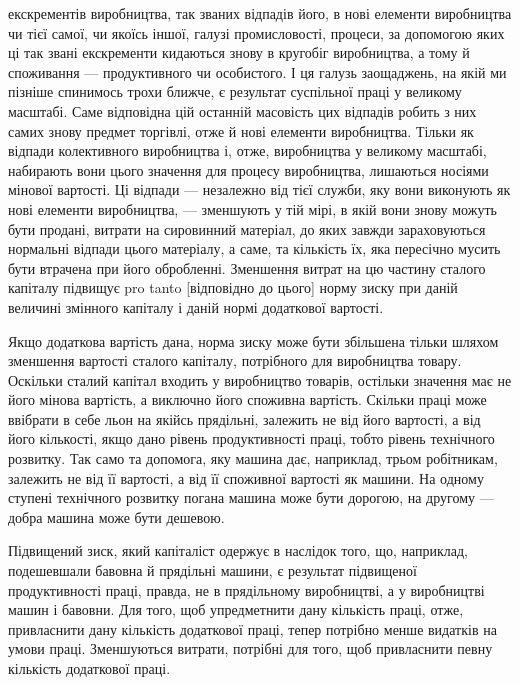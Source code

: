 \parcont{}  %
екскрементів виробництва, так званих відпадів його, в нові елементи
виробництва чи тієї самої, чи якоїсь іншої, галузі промисловості,
процеси, за допомогою яких ці так звані екскременти
кидаються знову в кругобіг виробництва, а тому й споживання —
продуктивного чи особистого. І ця галузь заощаджень, на якій
ми пізніше спинимось трохи ближче, є результат суспільної
праці у великому масштабі. Саме відповідна цій останній масовість
цих відпадів робить з них самих знову предмет торгівлі,
отже й нові елементи виробництва. Тільки як відпади колективного
виробництва і, отже, виробництва у великому масштабі, набирають
вони цього значення для процесу виробництва, лишаються
носіями мінової вартості. Ці відпади — незалежно від тієї служби,
яку вони виконують як нові елементи виробництва, — зменшують
у тій мірі, в якій вони знову можуть бути продані, витрати на
сировинний матеріал, до яких завжди зараховуються нормальні
відпади цього матеріалу, а саме, та кількість їх, яка пересічно
мусить бути втрачена при його обробленні. Зменшення витрат
на цю частину сталого капіталу підвищує pro tanto [відповідно
до цього] норму зиску при даній величині змінного капіталу
і даній нормі додаткової вартості.

Якщо додаткова вартість дана, норма зиску може бути
збільшена тільки шляхом зменшення вартості сталого капіталу,
потрібного для виробництва товару. Оскільки сталий капітал
входить у виробництво товарів, остільки значення має не його
мінова вартість, а виключно його споживна вартість. Скільки
праці може ввібрати в себе льон на якійсь прядільні, залежить
не від його вартості, а від його кількості, якщо дано рівень
продуктивності праці, тобто рівень технічного розвитку. Так
само та допомога, яку машина дає, наприклад, трьом робітникам,
залежить не від її вартості, а від її споживної вартості як машини.
На одному ступені технічного розвитку погана машина може бути
дорогою, на другому — добра машина може бути дешевою.

Підвищений зиск, який капіталіст одержує в наслідок того,
що, наприклад, подешевшали бавовна й прядільні машини, є результат
підвищеної продуктивності праці, правда, не в прядільному
виробництві, а у виробництві машин і бавовни. Для того,
щоб упредметнити дану кількість праці, отже, привласнити дану
кількість додаткової праці, тепер потрібно менше видатків на
умови праці. Зменшуються витрати, потрібні для того, щоб привласнити
певну кількість додаткової праці.

